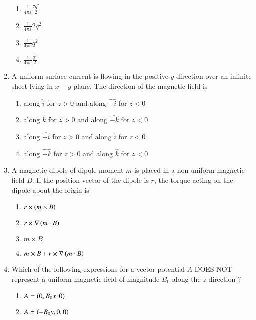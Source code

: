 \documentclass[journal,12pt,onecolumn]{IEEEtran}
\theoremstyle{remark}
\begin{document}
\begin{enumerate}[start=14]
\begin{center}
		\begin{enumerate}
	\item $\frac{1}{4\pi\varepsilon}\frac{7q^2}{2}$
	\item $\frac{1}{4\pi\varepsilon}2q^2$
	\item $\frac{1}{4\pi\varepsilon}q^2$
	\item $\frac{1}{4\pi\varepsilon}\frac{q^2}{2}$
		\end{enumerate}
\end{center}
\item A uniform surface current is flowing in the positive $y$-direction over an infinite sheet lying in $x-y$ plane. The direction of the magnetic field is 
	\begin{enumerate}
\item along $\hat{i}$ for $z>0$ and along $\hat{-i}$ for $z<0$
\item along $\hat{k}$ for $z>0$ and along $\hat{-k}$ for $z<0$
\item along $\hat{-i}$ for $z>0$ and along $\hat{i}$ for $z<0$
\item along $\hat{-k}$ for $z>0$ and along $\hat{k}$ for $z<0$
	\end{enumerate}
\item A magnetic dipole of dipole moment $m$ is placed in a non-uniform magnetic field $B$. If the position vector of the dipole is $r$, the torque acting on the dipole about the origin is
	\begin{enumerate}
\item $r\times\left(m\times B\right)$
\item $r\times \nabla \left(m\cdot B\right)$
\item $m\times B$
\item $m\times B+ r \times\nabla\left(m\cdot B\right)$
	\end{enumerate}
\item Which of the following expressions for a vector potential $A$ DOES NOT represent a uniform magnetic field of magnitude $B_0$ along the $z$-direction ?
	\begin{enumerate}
		\item $A=\left(0,B_0x,0\right)$ 
		\item $A=\left(-B_0y,0,0\right)$ 

\end{enumerate}
\end{enumerate}
\end{document}
